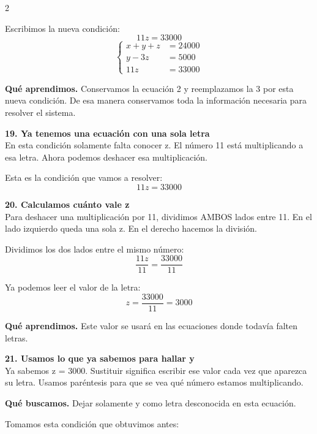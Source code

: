 \documentclass[11pt,a4paper,landscape]{article}
\begin{document}
\begin{multicols*}{2}
\begin{minipage}{\linewidth}
\par\smallskip Escribimos la nueva condición:
\[11z = 33000\]
\[\left\{\begin{aligned}x + y + z &= 24000\\y - 3z &= 5000\\11z &= 33000\end{aligned}\right.\]
\par\smallskip\textbf{Qué aprendimos.} Conservamos la ecuación 2 y reemplazamos la 3 por esta nueva condición. De esa manera conservamos toda la información necesaria para resolver el sistema.
\end{minipage}\par\medskip
\noindent\begin{minipage}{\linewidth}\textbf{19. Ya tenemos una ecuación con una sola letra}\\[2pt]En esta condición solamente falta conocer z. El número 11 está multiplicando a esa letra. Ahora podemos deshacer esa multiplicación.
\par\smallskip Esta es la condición que vamos a resolver:
\[11z = 33000\]
\end{minipage}\par\medskip
\noindent\begin{minipage}{\linewidth}\textbf{20. Calculamos cuánto vale z}\\[2pt]Para deshacer una multiplicación por 11, dividimos AMBOS lados entre 11. En el lado izquierdo queda una sola z. En el derecho hacemos la división.
\par\smallskip Dividimos los dos lados entre el mismo número:
\[\frac{11z}{11}=\frac{33000}{11}\]
\par\smallskip Ya podemos leer el valor de la letra:
\[z=\frac{33000}{11}=3000\]
\par\smallskip\textbf{Qué aprendimos.} Este valor se usará en las ecuaciones donde todavía falten letras.
\end{minipage}\par\medskip
\noindent\begin{minipage}{\linewidth}\textbf{21. Usamos lo que ya sabemos para hallar y}\\[2pt]Ya sabemos z = 3000. Sustituir significa escribir ese valor cada vez que aparezca su letra. Usamos paréntesis para que se vea qué número estamos multiplicando.
\par\smallskip\textbf{Qué buscamos.} Dejar solamente y como letra desconocida en esta ecuación.
\par\smallskip Tomamos esta condición que obtuvimos antes:

\end{minipage}
\end{multicols*}
\end{document}
